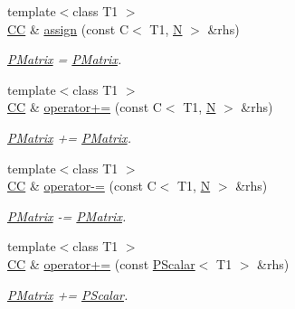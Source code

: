 \begin{DoxyCompactItemize}
{\footnotesize template$<$class T1 $>$ }\\\mbox{\hyperlink{classENSEM_1_1PMatrix_a744bac549029029effe32dc1705660ec}{CC}} \& \mbox{\hyperlink{classENSEM_1_1PMatrix_ac3c0e489c8c8011edc4ea93477176b84}{assign}} (const C$<$ T1, \mbox{\hyperlink{operator__name__util_8cc_a7722c8ecbb62d99aee7ce68b1752f337}{N}} $>$ \&rhs)
\begin{DoxyCompactList}\small\item\em \mbox{\hyperlink{classENSEM_1_1PMatrix}{P\+Matrix}} = \mbox{\hyperlink{classENSEM_1_1PMatrix}{P\+Matrix}}. \end{DoxyCompactList}\item 
{\footnotesize template$<$class T1 $>$ }\\\mbox{\hyperlink{classENSEM_1_1PMatrix_a744bac549029029effe32dc1705660ec}{CC}} \& \mbox{\hyperlink{classENSEM_1_1PMatrix_af6bd651888f2621169845b757b2200ee}{operator+=}} (const C$<$ T1, \mbox{\hyperlink{operator__name__util_8cc_a7722c8ecbb62d99aee7ce68b1752f337}{N}} $>$ \&rhs)
\begin{DoxyCompactList}\small\item\em \mbox{\hyperlink{classENSEM_1_1PMatrix}{P\+Matrix}} += \mbox{\hyperlink{classENSEM_1_1PMatrix}{P\+Matrix}}. \end{DoxyCompactList}\item 
{\footnotesize template$<$class T1 $>$ }\\\mbox{\hyperlink{classENSEM_1_1PMatrix_a744bac549029029effe32dc1705660ec}{CC}} \& \mbox{\hyperlink{classENSEM_1_1PMatrix_a76fa178c64fa75b73925016654a08766}{operator-\/=}} (const C$<$ T1, \mbox{\hyperlink{operator__name__util_8cc_a7722c8ecbb62d99aee7ce68b1752f337}{N}} $>$ \&rhs)
\begin{DoxyCompactList}\small\item\em \mbox{\hyperlink{classENSEM_1_1PMatrix}{P\+Matrix}} -\/= \mbox{\hyperlink{classENSEM_1_1PMatrix}{P\+Matrix}}. \end{DoxyCompactList}\item 
{\footnotesize template$<$class T1 $>$ }\\\mbox{\hyperlink{classENSEM_1_1PMatrix_a744bac549029029effe32dc1705660ec}{CC}} \& \mbox{\hyperlink{classENSEM_1_1PMatrix_a141db586d4797230e05d41ab13c12a1e}{operator+=}} (const \mbox{\hyperlink{classENSEM_1_1PScalar}{P\+Scalar}}$<$ T1 $>$ \&rhs)
\begin{DoxyCompactList}\small\item\em \mbox{\hyperlink{classENSEM_1_1PMatrix}{P\+Matrix}} += \mbox{\hyperlink{classENSEM_1_1PScalar}{P\+Scalar}}. \end{DoxyCompactList}\item 

\end{DoxyCompactItemize}
